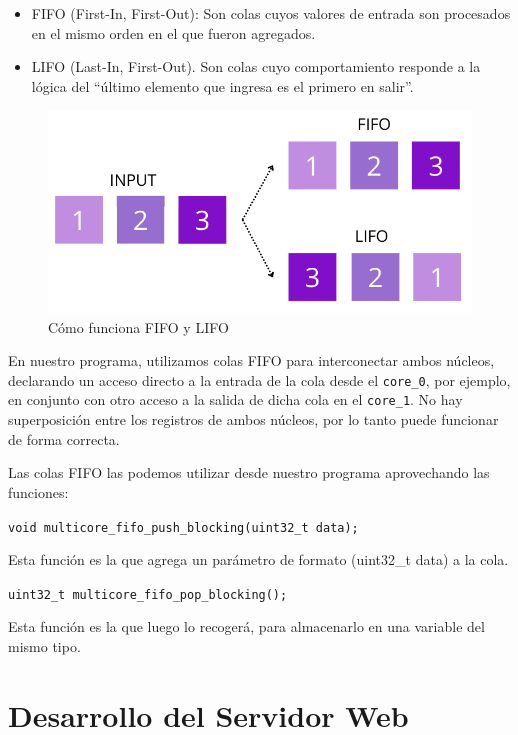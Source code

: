                     \begin{itemize} [label=•]
                        \setlength{\itemindent}{1.5em}
                        \item FIFO (First-In, First-Out): Son colas cuyos valores de entrada son procesados en el mismo orden en el que fueron agregados.
                        \item LIFO (Last-In, First-Out). Son colas cuyo comportamiento responde a la lógica del “último elemento que ingresa es el primero en salir”.
                    \end{itemize}

                    \begin{figure}[H]
                        \centering
                        \includegraphics[width=0.5\linewidth]{Imagenes/Software/FIFO.jpg}
                        \caption{Cómo funciona FIFO y LIFO}
                        \label{fig:s1}
                    \end{figure}

                    En  nuestro programa, utilizamos colas FIFO para interconectar ambos núcleos, declarando un acceso directo a la entrada de la cola desde el \texttt{core\_0}, por ejemplo, en conjunto con otro acceso a la salida de dicha cola en el \texttt{core\_1}. No hay superposición entre los registros de ambos núcleos, por lo tanto puede funcionar de forma correcta.\par
	                Las colas FIFO las podemos utilizar desde nuestro programa aprovechando las funciones:\par
                    \texttt{void multicore\_fifo\_push\_blocking(uint32\_t data);}\par
                    Esta función es la que agrega un parámetro de formato (uint32\_t data) a la cola.\par
                    \texttt{uint32\_t multicore\_fifo\_pop\_blocking();}\par
                    Esta función es la que luego lo recogerá, para almacenarlo en una variable del mismo tipo.\par
                
        \section{Desarrollo del Servidor Web}
